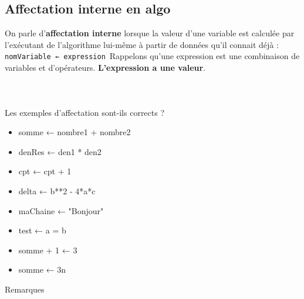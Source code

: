 \documentclass[11pt,a4paper]{article}
\begin{document}
            \par
        \subsection{Affectation interne en algo}
          On parle d'\textbf{affectation interne} lorsque la valeur d'une variable est \guillemotleft  calcul\'ee \guillemotright  par l'ex\'ecutant
          de l'algorithme lui-m\^eme \`a partir de donn\'ees qu'il connait d\'ej\`a :
          \,\verb|nomVariable ← expression|\,
          Rappelons qu'une expression est une combinaison de variables et d'op\'erateurs. \textbf{L'expression a une valeur}.
        
            \par
        
			
		\subparagraph{} 
		
                \textcolor{white}{.} \par
            Les exemples d'affectation sont-ils corrects ?
						
            \begin{itemize} 
        
            \item[ \ding{"6F} ] somme ← nombre1 + nombre2
        
            \item[ \ding{"6F} ] denRes ← den1 * den2
        
            \item[ \ding{"6F} ] cpt ← cpt + 1
        
            \item[ \ding{"6F} ] delta ← b**2 - 4*a*c
        
            \item[ \ding{"6F} ] maChaine ← "Bonjour"
        
            \item[ \ding{"6F} ] test ← a = b
        
            \item[ \ding{"6F} ] somme + 1 ← 3
        
            \item[ \ding{"6F} ] somme ← 3n
        
            \end{itemize} 
        
				Remarques
				
\end{document}
